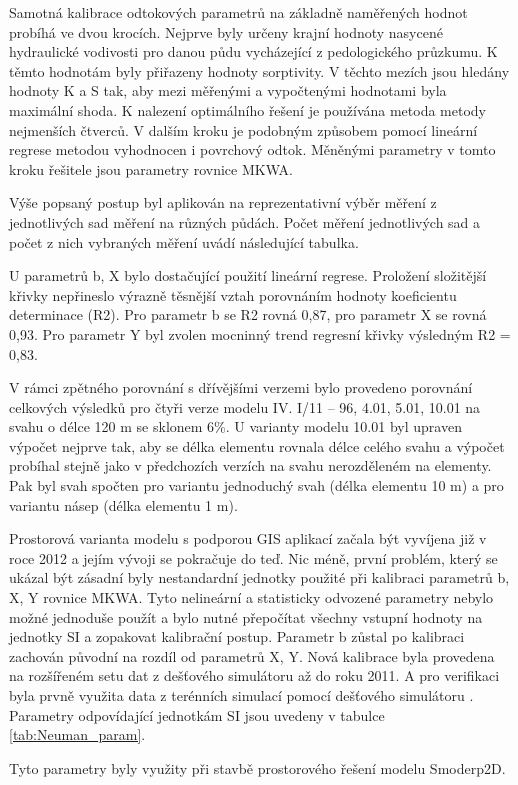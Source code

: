 Samotná kalibrace odtokových parametrů na základně naměřených hodnot probíhá ve dvou krocích. Nejprve byly určeny krajní hodnoty nasycené hydraulické vodivosti pro danou půdu vycházející z pedologického průzkumu. K těmto hodnotám byly přiřazeny hodnoty sorptivity. V těchto mezích jsou hledány hodnoty K a S tak, aby mezi měřenými a vypočtenými hodnotami byla maximální shoda. K nalezení optimálního řešení je používána metoda metody nejmenších čtverců. V dalším kroku je podobným způsobem pomocí lineární regrese metodou vyhodnocen i povrchový odtok. Měněnými parametry v tomto kroku řešitele jsou parametry rovnice \acs{MKWA}.

Výše popsaný postup byl aplikován na reprezentativní výběr měření z jednotlivých sad měření na různých půdách. Počet měření jednotlivých sad a počet z nich vybraných měření uvádí následující tabulka.



U parametrů b, X bylo dostačující použití lineární regrese. Proložení složitější křivky nepřineslo výrazně těsnější vztah porovnáním hodnoty koeficientu determinace (R2). Pro parametr b se R2 rovná 0,87, pro parametr X se rovná 0,93. Pro parametr Y byl zvolen mocninný trend regresní křivky výsledným R2 = 0,83.

 

V rámci zpětného porovnání s dřívějšími verzemi bylo provedeno porovnání celkových výsledků pro čtyři verze modelu IV. I/11 – 96, 4.01, 5.01, 10.01 na svahu o délce 120 m se sklonem 6\%. U varianty modelu 10.01 byl upraven výpočet nejprve tak, aby se délka elementu rovnala délce celého svahu a výpočet probíhal stejně jako v předchozích verzích na svahu nerozděleném na elementy. Pak byl svah spočten pro variantu jednoduchý svah (délka elementu 10 m) a pro variantu násep (délka elementu 1 m).



Prostorová varianta modelu s podporou GIS aplikací začala být vyvíjena již v roce 2012  a jejím vývoji se pokračuje do teď. Nic méně, první problém, který se ukázal být zásadní byly nestandardní jednotky použité při kalibraci parametrů \acs{b}, \acs{X}, \acs{Y} rovnice \acs{MKWA}. Tyto nelineární a statisticky odvozené parametry nebylo možné jednoduše použít a bylo nutné přepočítat všechny vstupní hodnoty na jednotky SI a zopakovat kalibrační postup. Parametr \acs{b} zůstal po kalibraci zachován původní na rozdíl od parametrů \acs{X}, \acs{Y}. Nová kalibrace byla provedena na rozšířeném setu dat z dešťového simulátoru až do roku 2011. A pro verifikaci byla prvně využita data z terénních simulací pomocí dešťového simulátoru \citep{EGUDS}. Parametry odpovídající jednotkám SI jsou uvedeny v tabulce \ref{tab:Neuman_param}.



Tyto parametry byly využity při stavbě prostorového řešení modelu Smoderp2D.